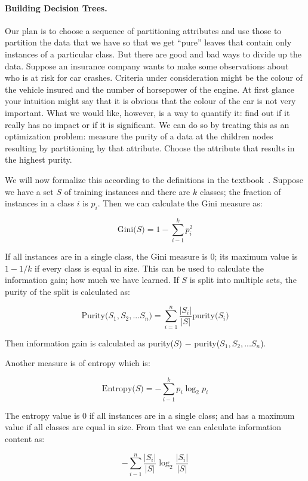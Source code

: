 \paragraph{Building Decision Trees.}
Our plan is to choose a sequence of partitioning attributes and use those to partition the data that we have so that we get ``pure'' leaves that contain only instances of a particular class. But there are good and bad ways to divide up the data. Suppose an insurance company wants to make some observations about who is at risk for car crashes. Criteria under consideration might be the colour of the vehicle insured and the number of horsepower of the engine. At first glance your intuition might say that it is obvious that the colour of the car is not very important. What we would like, however, is a way to quantify it: find out if it really has no impact or if it is significant. We can do so by treating this as an optimization problem: measure the purity of a data at the children nodes resulting by partitioning by that attribute. Choose the attribute that results in the highest purity.

We will now formalize this according to the definitions in the textbook~\cite{dsc}. Suppose we have a set $S$ of training instances and there are $k$ classes; the fraction of instances in a class $i$ is $p_{i}$. Then we can calculate the Gini measure as:


$$\mbox{Gini($S$)} = 1 - \sum_{i-1}^{k}p_{i}^{2}$$

If all instances are in a single class, the Gini measure is 0; its maximum value is $1-1/k$ if every class is equal in size. This can be used to calculate the information gain; how much we have learned. If $S$ is split into multiple sets, the purity of the split is calculated as:

$$\mbox{Purity($S_{1}, S_{2}, ... S_{n}$)} = \sum_{i = 1}^{n}\dfrac{|S_{i}|}{|S|} \mbox{purity($S_{i}$)}$$

Then information gain is calculated as purity($S$) $-$ purity($S_{1}, S_{2}, ... S_{n}$).

Another measure is of entropy which is:

$$\mbox{Entropy($S$)} = - \sum_{i-1}^{k}p_{i} \log_{2} p_{i}$$

The entropy value is 0 if all instances are in a single class; and has a maximum value if all classes are equal in size. From that we can calculate information content as:

$$ - \sum_{i-1}^{n} \dfrac{|S_{i}|}{|S|}  \log_{2} \dfrac{|S_{i}|}{|S|} $$


